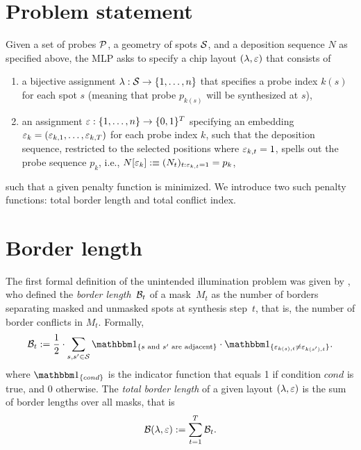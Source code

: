 \section{Problem statement}
\label{sec:mlp_problem}

Given a set of probes ${\mathcal{P}}$, a geometry of spots ${\mathcal{S}}$, and a deposition
sequence $N$ as specified above, the MLP asks to specify a chip layout
$(\lambda,\varepsilon)$ that consists of
\begin{enumerate}
\item a bijective assignment $\lambda: {\mathcal{S}}\to \{1,\dots,n\}$ that specifies a
  probe index $k(s)$ for each spot $s$ (meaning that probe $p_{k(s)}$ will be
  synthesized at $s$),
\item an assignment $\varepsilon: \{1,\dots,n\}\to \{0,1\}^T$ specifying an embedding
  $\varepsilon_k = (\varepsilon_{k,1},\dots,\varepsilon_{k,T})$ for each probe index $k$, such that
  the deposition sequence, restricted to the selected positions where
  $\varepsilon_{k,t}=1$, spells out the probe sequence $p_k$, i.e.,
  $N[\varepsilon_k] :\equiv (N_t)_{t: \varepsilon_{k,t}=1} = p_k$,
\end{enumerate}
such that a given penalty function is minimized.  We introduce two such penalty
functions: total border length and total conflict index.


\section{Border length}
\label{sec:mlp_border_length}

The first formal definition of the unintended illumination problem was given by
\citet{Hannenhalli2002}, who defined the \emph{border length}~${\mathcal{B}}_t$ of a
mask~$M_{t}$ as the number of borders separating masked and unmasked spots at
synthesis step~$t$, that is, the number of border conflicts in $M_{t}$.
Formally,
\begin{equation}
\label{eq:border_length}
  \CalB_t := \frac{1}{2} \cdot \sum_{s,s' \in \CalS}
    \Ind{s \text{ and } s' \text{ are adjacent}}
    \cdot \Ind{\eps_{k(s),t} \neq \eps_{k(s'),t}}.
\end{equation}
where $\Ind{cond}$ is the indicator function that equals 1 if condition $cond$
is true, and 0 otherwise. The \emph{total border length} of a given layout
$(\lambda,\varepsilon)$ is the sum of border lengths over all masks, that is
\begin{equation}
\label{eq:total_border_length}
  {\mathcal{B}}(\lambda,\varepsilon) := \sum_{t=1}^{T} {\mathcal{B}}_t.
\end{equation}

